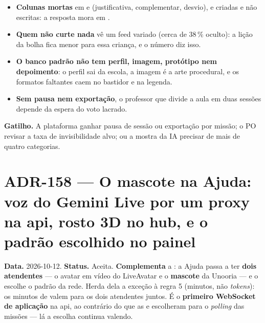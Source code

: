 \begin{itemize}
  \item \textbf{Colunas mortas} em  e
     (justificativa, complementar, desvio), e
     criadas e não escritas: a resposta mora em
    .
  \item \textbf{Quem não curte nada} vê um feed variado (cerca de 38\,\% oculto):
    a lição da bolha fica menor para essa criança, e o número diz isso.
  \item \textbf{O banco padrão não tem perfil, imagem, protótipo nem
    depoimento}: o perfil sai da escola, a imagem é a arte procedural, e os
    formatos faltantes caem no bastidor e na legenda.
  \item \textbf{Sem pausa nem exportação}, o professor que divide a aula em
    duas sessões depende da espera do voto lacrado.
\end{itemize}

\textbf{Gatilho.} A plataforma ganhar pausa de sessão ou exportação por
missão; o PO revisar a taxa de invisibilidade alvo; ou a mostra da IA precisar
de mais de quatro categorias.

\section{ADR-158 --- O mascote na Ajuda: voz do Gemini Live por um proxy na api, rosto 3D no hub, e o padrão escolhido no painel}
\label{adr:ajuda-mascote}

\textbf{Data.} 2026-10-12. \textbf{Status.} Aceita. \textbf{Complementa} a
: a Ajuda passa a ter \textbf{dois atendentes} --- o avatar em
vídeo do LiveAvatar e o \textbf{mascote} da Unooria --- e o  escolhe o
padrão da rede. Herda dela a exceção à regra 5 (minutos, não \emph{tokens}): os
minutos de  valem para os dois atendentes juntos. É o
\textbf{primeiro WebSocket de aplicação} na api, ao contrário do que as
 e  escolheram para o \emph{polling} das missões ---
lá a escolha continua valendo.

